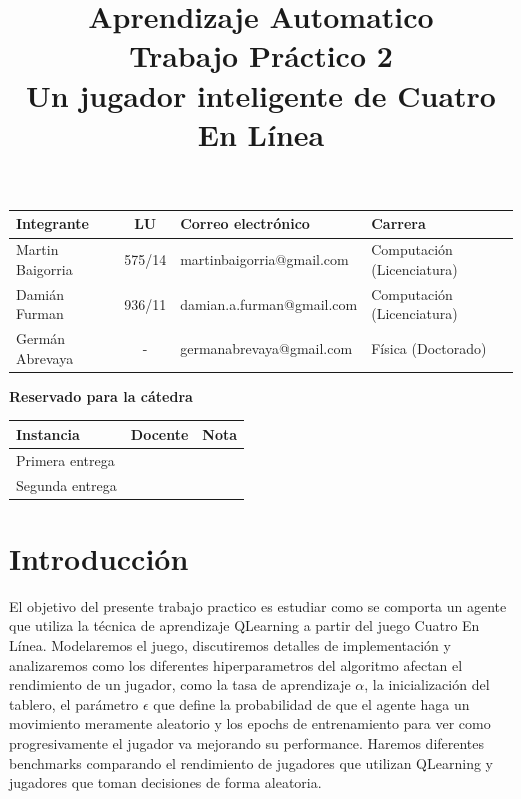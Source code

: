 \documentclass[10pt,a4paper]{article}
\title{Aprendizaje Automatico \\ Trabajo Práctico 2 \\ Un jugador inteligente de Cuatro En Línea }
\begin{document}

\maketitle

\bigskip

\begin{table}[h]
\centering
\begin{tabular}{|l l l l|}
\hline
Integrante       & \multicolumn{1}{c}{LU}     & Correo electrónico              & Carrera \\ \hline
Martin Baigorria & \multicolumn{1}{c}{575/14} & martinbaigorria@gmail.com & Computación (Licenciatura) \\
Damián Furman & \multicolumn{1}{c}{936/11}& damian.a.furman@gmail.com & Computación (Licenciatura)\\
Germán Abrevaya & \multicolumn{1}{c}{-} & germanabrevaya@gmail.com & Física (Doctorado)\\ \hline
\end{tabular}
\end{table}

\vfill

\begin{center}
\textbf{Reservado para la cátedra}
\end{center}
\begin{table}[h]
\centering
\begin{tabular}{|l|l|l|}
\hline
Instancia       & Docente & Nota \\ \hline
Primera entrega &         &      \\ \hline
Segunda entrega &         &      \\ \hline
\end{tabular}
\end{table}

\newpage
\tableofcontents
\newpage


\section{Introducción}

El objetivo del presente trabajo practico es estudiar como se comporta un agente que utiliza la técnica de aprendizaje QLearning a partir del juego Cuatro En Línea. Modelaremos el juego, discutiremos detalles de implementación y analizaremos como los diferentes hiperparametros del algoritmo afectan el rendimiento de un jugador, como la tasa de aprendizaje $\alpha$, la inicialización del tablero, el parámetro $\epsilon$ que define la probabilidad de que el agente haga un movimiento meramente aleatorio y los epochs de entrenamiento para ver como progresivamente el jugador va mejorando su performance. Haremos diferentes benchmarks comparando el rendimiento de jugadores que utilizan QLearning y jugadores que toman decisiones de forma aleatoria.
\end{document}
